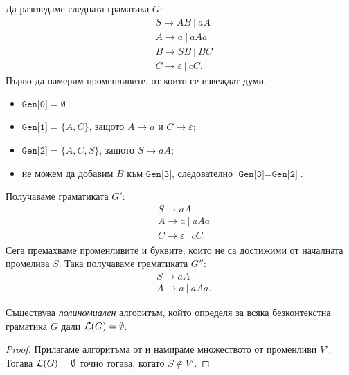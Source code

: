 \begin{extra2}
  

\begin{example}
  Да разгледаме следната граматика $G$:
  \begin{align*}
    & S \to AB\ |\ aA\\
    & A \to a\ |\ aAa\\
    & B \to SB\ |\ BC\\
    & C \to \varepsilon\ |\ cC.
  \end{align*}
  Първо да намерим променливите, от които се извеждат думи.
  \begin{itemize}
  \item
    $\texttt{Gen[0]} = \emptyset$
  \item 
    $\texttt{Gen[1]} = \{A, C\}$, защото $A \to a$ и $C \to \varepsilon$;
  \item
    $\texttt{Gen[2]} = \{A, C, S\}$, защото $S \to aA$;
  \item
    не можем да добавим $B$ към $\texttt{Gen[3]}$, следователно $\texttt{Gen[3]} = \texttt{Gen[2]}$.
  \end{itemize}
  Получаваме граматиката $G'$:
  \begin{align*}
    & S \to aA\\
    & A \to a\ |\ aAa\\
    & C \to \varepsilon\ |\ cC.
  \end{align*}
  Сега премахваме променливите и буквите, които не са достижими от началната промелива $S$. Така получаваме граматиката $G''$:
  \begin{align*}
    & S \to aA\\
    & A \to a\ |\ aAa.
  \end{align*}
\end{example}
\end{extra2}


\begin{framed}
  \begin{corollary}
    Съществува {\em полиномиален} алгоритъм, който определя за всяка безконтекстна граматика $G$ дали $\mathcal{L}(G) = \emptyset$.
  \end{corollary}  
\end{framed}
\begin{proof}
  Прилагаме алгоритъма от  и намираме множеството от променливи $V'$.
  Тогава $\mathcal{L}(G) = \emptyset$ точно тогава, когато $S \not\in V'$.  
\end{proof}

